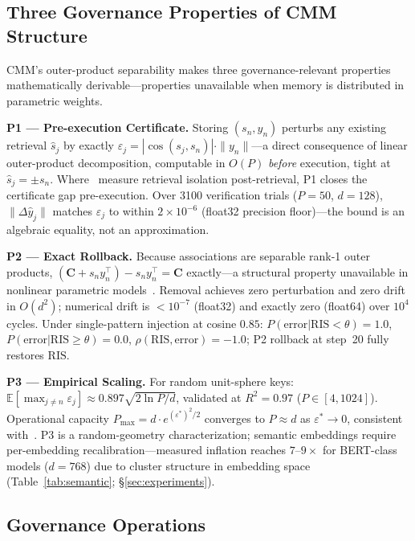\documentclass{ceurart}
\newcommand{\RIS}{\mathrm{RIS}}
\newcommand{\CMM}{\mathbf{C}}
\begin{document}
\subsection{Three Governance Properties of CMM Structure}

CMM's outer-product separability makes three governance-relevant properties
mathematically derivable---properties unavailable when memory is distributed
in parametric weights.

\noindent\textbf{P1 --- Pre-execution Certificate.}
Storing $(s_n, y_n)$ perturbs any existing retrieval $\hat{s}_j$ by
exactly $\varepsilon_j = |\cos(s_j, s_n)|\cdot\|y_n\|$---a direct consequence
of linear outer-product decomposition, computable in $O(P)$
\emph{before} execution, tight at $\hat{s}_j = \pm s_n$.
Where~\citet{ramsauer2021hopfield} measure retrieval isolation post-retrieval,
P1 closes the certificate gap pre-execution.
Over 3100 verification trials ($P{=}50$, $d{=}128$), $\|\Delta\hat{y}_j\|$
matches $\varepsilon_j$ to within $2{\times}10^{-6}$ (float32 precision
floor)---the bound is an algebraic equality, not an approximation.

\noindent\textbf{P2 --- Exact Rollback.}
Because associations are separable rank-1 outer products,
$(\CMM + s_n y_n^\top) - s_n y_n^\top = \CMM$ exactly---a structural property
unavailable in nonlinear parametric models~\citep{guo2020certified}.
Removal achieves zero perturbation and zero drift in $O(d^2)$;
numerical drift is ${<}10^{-7}$ (float32) and exactly zero (float64)
over $10^4$ cycles.
Under single-pattern injection at cosine $0.85$:
$P(\text{error}|\RIS{<}\theta){=}1.0$, $P(\text{error}|\RIS{\geq}\theta){=}0.0$,
$\rho(\RIS,\text{error}){=}{-}1.0$; P2 rollback at step~20 fully restores $\RIS$.

\noindent\textbf{P3 --- Empirical Scaling.}
For random unit-sphere keys:
$\mathbb{E}[\max_{j\neq n}\varepsilon_j] \approx 0.897\sqrt{2\ln P/d}$,
validated at $R^2{=}0.97$ ($P{\in}[4,1024]$).
Operational capacity $P_{\max} = d\cdot e^{(\varepsilon^*)^2/2}$ converges to
$P \approx d$ as $\varepsilon^*\to 0$, consistent with~\citet{cabannes2024scaling}.
P3 is a random-geometry characterization; semantic embeddings require
per-embedding recalibration---measured inflation reaches $7$--$9{\times}$ for
BERT-class models ($d{=}768$) due to cluster structure in embedding space
(Table~\ref{tab:semantic}; \S\ref{sec:experiments}).

\subsection{Governance Operations}
\end{document}
